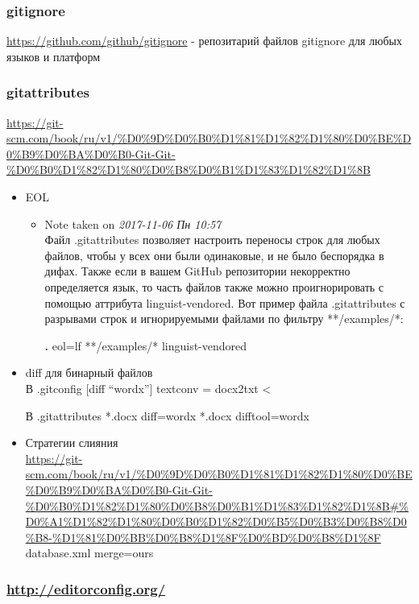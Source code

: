 \begin{frame}
\frametitle{gitignore}
\label{sec-2-2}

\href{https://github.com/github/gitignore}{https://github.com/github/gitignore} - репозитарий файлов gitignore для
любых языков и платформ
\end{frame}
\begin{frame}
\frametitle{gitattributes}
\label{sec-2-3}

\href{https://git-scm.com/book/ru/v1/%D0%9D%D0%B0%D1%81%D1%82%D1%80%D0%BE%D0%B9%D0%BA%D0%B0-Git-Git-%D0%B0%D1%82%D1%80%D0%B8%D0%B1%D1%83%D1%82%D1%8B}{https://git-scm.com/book/ru/v1/\%D0\%9D\%D0\%B0\%D1\%81\%D1\%82\%D1\%80\%D0\%BE\%D0\%B9\%D0\%BA\%D0\%B0-Git-Git-\%D0\%B0\%D1\%82\%D1\%80\%D0\%B8\%D0\%B1\%D1\%83\%D1\%82\%D1\%8B}
\begin{itemize}

\item EOL
\label{sec-2-3-1}%
\begin{itemize}
\item Note taken on \textit{2017-11-06 Пн 10:57} \\
Файл .gitattributes позволяет настроить переносы строк для любых
  файлов, чтобы у всех они были одинаковые, и не было беспорядка в
  дифах. Также если в вашем GitHub репозитории некорректно определяется
  язык, то часть файлов также можно проигнорировать с помощью аттрибута
  linguist-vendored. Вот пример файла .gitattributes с \n разрывами
  строк и игнорируемыми файлами по фильтру **/examples/*:
  
  \textbf{.} eol=lf
  **/examples/* linguist-vendored
\end{itemize}

\item diff для бинарный файлов\\
\label{sec-2-3-2}%
В .gitconfig 
[diff ``wordx'']
     textconv = docx2txt <

В .gitattributes
*.docx diff=wordx
*.docx difftool=wordx


\item Стратегии слияния\\
\label{sec-2-3-3}%
\href{https://git-scm.com/book/ru/v1/%D0%9D%D0%B0%D1%81%D1%82%D1%80%D0%BE%D0%B9%D0%BA%D0%B0-Git-Git-%D0%B0%D1%82%D1%80%D0%B8%D0%B1%D1%83%D1%82%D1%8B#%D0%A1%D1%82%D1%80%D0%B0%D1%82%D0%B5%D0%B3%D0%B8%D0%B8-%D1%81%D0%BB%D0%B8%D1%8F%D0%BD%D0%B8%D1%8F}{https://git-scm.com/book/ru/v1/\%D0\%9D\%D0\%B0\%D1\%81\%D1\%82\%D1\%80\%D0\%BE\%D0\%B9\%D0\%BA\%D0\%B0-Git-Git-\%D0\%B0\%D1\%82\%D1\%80\%D0\%B8\%D0\%B1\%D1\%83\%D1\%82\%D1\%8B\#\%D0\%A1\%D1\%82\%D1\%80\%D0\%B0\%D1\%82\%D0\%B5\%D0\%B3\%D0\%B8\%D0\%B8-\%D1\%81\%D0\%BB\%D0\%B8\%D1\%8F\%D0\%BD\%D0\%B8\%D1\%8F}
database.xml merge=ours
\end{itemize} %
\end{frame}
\begin{frame}
\frametitle{\href{http://editorconfig.org/}{http://editorconfig.org/}}
\label{sec-2-4}
\end{frame}
